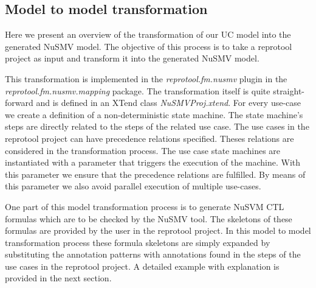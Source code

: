 \subsection{Model to model transformation}

Here we present an overview of the transformation of our UC model into the generated NuSMV model. The objective of this process is to
take a reprotool project as input and transform it into the generated NuSMV model.

This transformation is implemented in the \emph{reprotool.fm.nusmv} plugin in the \emph{reprotool.fm.nusmv.mapping} package.
The transformation itself is quite straight-forward and is defined in an XTend class \emph{NuSMVProj.xtend}.
For every use-case we create a definition of a non-deterministic state machine.
The state machine's steps are directly related to the steps of the related use case.
The use cases in the reprotool project can have precedence relations specified. Theses relations are considered in the
transformation process. The use case state machines are instantiated with a parameter that triggers the execution of the machine.
With this parameter we ensure that the precedence relations are fulfilled. By means of this parameter we also avoid parallel execution
of multiple use-cases.

One part of this model transformation process is to generate NuSVM CTL formulas which are to be checked by the NuSMV tool. The
skeletons of these formulas are provided by the user in the reprotool project. In this model to model transformation process these
formula skeletons are simply expanded by substituting the annotation patterns with annotations found in the steps of the use cases
in the reprotool project. A detailed example with explanation is provided in the next section.